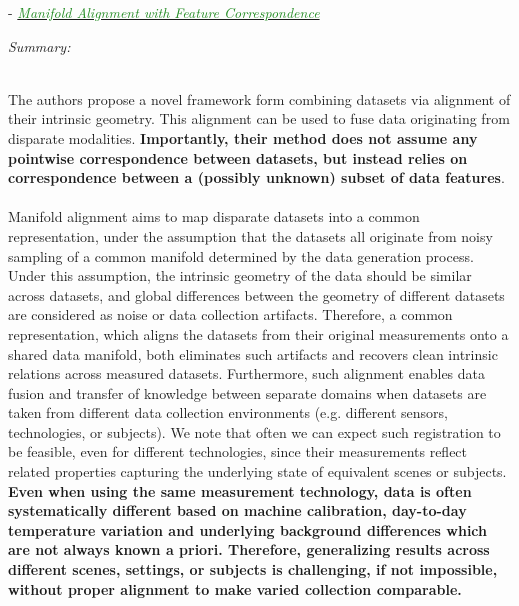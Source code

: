 \documentclass[]{article}
\newcommand{\paperentry}[4]{
            \hangindent=1cm
            \textcolor{red}{\cite{#1}} - \href{run:../References/#3}{\textcolor{ForestGreen}{\textit{#2}}}
            
            \noindent            
            \begin{minipage}[t]{0.1\linewidth}\hfill\end{minipage}
            \begin{minipage}[t]{0.8\linewidth}\textcolor{NavyBlue}{{\textit{Summary:}}}#4\end{minipage}
            \vspace{.25cm}
          }
\begin{document}
		\paperentry{Stanley2019ManAlignmentFeatureCorrespondence}
		{Manifold Alignment with Feature Correspondence}
		{Manifold_Representation_Learning/Alignment/Stanley2019ManAlignmentFeatureCorrespondence.pdf}
		{}\\
		The authors propose a novel framework form combining datasets via alignment of their intrinsic geometry.  This alignment can be used to fuse data originating from disparate modalities.  \textbf{Importantly, their method does not assume any pointwise correspondence between datasets, but instead relies on correspondence  between a (possibly unknown) subset of data features}.
		\\ \\
		Manifold alignment aims to map disparate datasets into a common representation, under the assumption that the datasets all originate from noisy sampling of a common manifold determined by the data generation process.  Under this assumption, the intrinsic geometry of the data should be similar across datasets, and global differences between the geometry of different datasets are considered as noise or data collection artifacts. Therefore, a common representation, which aligns the datasets from their original measurements onto a shared data manifold, both eliminates such artifacts and recovers clean intrinsic relations across measured datasets.  Furthermore, such alignment enables data fusion and transfer of knowledge between separate domains when datasets are taken from different data collection environments (e.g. different sensors, technologies, or subjects).  We note that often we can expect such registration to be feasible, even for different technologies, since their measurements reflect related properties capturing the underlying state of equivalent scenes or subjects.  \textbf{Even when using the same measurement technology, data is often systematically different based on machine calibration, day-to-day temperature variation and underlying background differences which are not always known a priori.  Therefore, generalizing results across different scenes, settings, or subjects is challenging, if not impossible, without proper alignment to make varied collection comparable.}
		\\ \\
\end{document}
